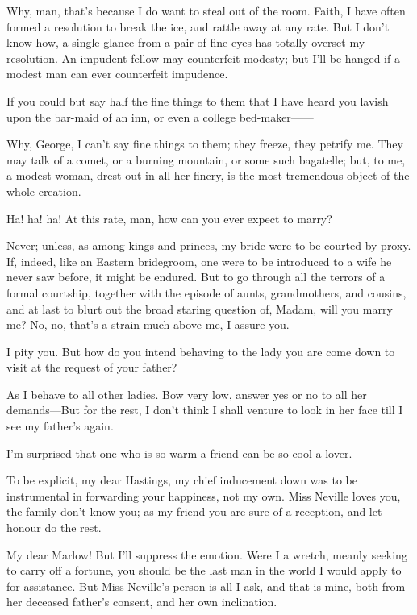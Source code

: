 \documentclass{book}
\begin{document}
\2  Why, man, that's because I do want to steal out of the room. 
Faith, I have often formed a resolution to break the ice, and rattle
away at any rate.  But I don't know how, a single glance from a pair of
fine eyes has totally overset my resolution.  An impudent fellow may
counterfeit modesty; but I'll be hanged if a modest man can ever
counterfeit impudence.

\4  If you could but say half the fine things to them that I
have heard you lavish upon the bar-maid of an inn, or even a college
bed-maker------

\2  Why, George, I can't say fine things to them; they freeze,
they petrify me.  They may talk of a comet, or a burning mountain, or
some such bagatelle; but, to me, a modest woman, drest out in all her
finery, is the most tremendous object of the whole creation.

\4  Ha! ha! ha!  At this rate, man, how can you ever expect to
marry?

\2  Never; unless, as among kings and princes, my bride were to be
courted by proxy.  If, indeed, like an Eastern bridegroom, one were to
be introduced to a wife he never saw before, it might be endured.  But
to go through all the terrors of a formal courtship, together with the
episode of aunts, grandmothers, and cousins, and at last to blurt out
the broad staring question of, Madam, will you marry me?  No, no,
that's a strain much above me, I assure you.

\4  I pity you.  But how do you intend behaving to the lady you
are come down to visit at the request of your father?

\2  As I behave to all other ladies.  Bow very low, answer yes or
no to all her demands---But for the rest, I don't think I shall venture
to look in her face till I see my father's again.

\4  I'm surprised that one who is so warm a friend can be so
cool a lover.

\2  To be explicit, my dear Hastings, my chief inducement down was
to be instrumental in forwarding your happiness, not my own.  Miss
Neville loves you, the family don't know you; as my friend you are sure
of a reception, and let honour do the rest.

\4  My dear Marlow!  But I'll suppress the emotion.  Were I a
wretch, meanly seeking to carry off a fortune, you should be the last
man in the world I would apply to for assistance.  But Miss Neville's
person is all I ask, and that is mine, both from her deceased father's
consent, and her own inclination.
\end{document}
